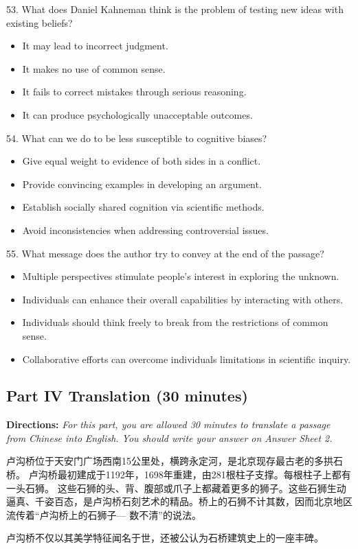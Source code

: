 \documentclass[UTF8,11pt]{ctexart}
\begin{document}
53. What does Daniel Kahneman think is the problem of testing new ideas with existing beliefs?


\begin{itemize}[leftmargin=2em,itemsep=.2em,topsep=.4em]\item[A.] It may lead to incorrect judgment.
\item[B.] It makes no use of common sense.
\item[C.] It fails to correct mistakes through serious reasoning.
\item[D.] It can produce psychologically unacceptable outcomes.
\end{itemize}

54. What can we do to be less susceptible to cognitive biases?


\begin{itemize}[leftmargin=2em,itemsep=.2em,topsep=.4em]\item[A.] Give equal weight to evidence of both sides in a conflict.
\item[B.] Provide convincing examples in developing an argument.
\item[C.] Establish socially shared cognition via scientific methods.
\item[D.] Avoid inconsistencies when addressing controversial issues.
\end{itemize}

55. What message does the author try to convey at the end of the passage?


\begin{itemize}[leftmargin=2em,itemsep=.2em,topsep=.4em]\item[A.] Multiple perspectives stimulate people's interest in exploring the unknown.
\item[B.] Individuals can enhance their overall capabilities by interacting with others.
\item[C.] Individuals should think freely to break from the restrictions of common sense.
\item[D.] Collaborative efforts can overcome individuals limitations in scientific inquiry.
\end{itemize}

\subsection*{\textbf{Part IV} \textbf{Translation} \textbf{(30 minutes)}}


\textbf{Directions: }\textit{For this part, you are allowed 30 minutes to translate a passage from Chinese into} \textit{English. You should write your answer on Answer Sheet 2.}


卢沟桥位于天安门广场西南15公里处，横跨永定河，是北京现存最古老的多拱石桥。 卢沟桥最初建成于1192年，1698年重建，由281根柱子支撑。每根柱子上都有一头石狮。 这些石狮的头、背、腹部或爪子上都藏着更多的狮子。这些石狮生动逼真、千姿百态，是卢沟桥石刻艺术的精品。桥上的石狮不计其数，因而北京地区流传着“卢沟桥上的石狮子— 数不清”的说法。


卢沟桥不仅以其美学特征闻名于世，还被公认为石桥建筑史上的一座丰碑。
\end{document}
